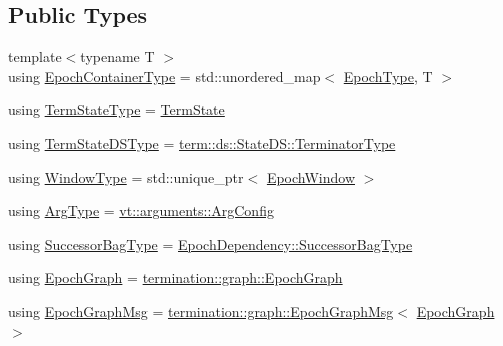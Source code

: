 \subsection*{Public Types}
\begin{DoxyCompactItemize}
\item 
{\footnotesize template$<$typename T $>$ }\\using \hyperlink{structvt_1_1term_1_1_termination_detector_a69e2615b61e072977463eea5b20b7933}{Epoch\+Container\+Type} = std\+::unordered\+\_\+map$<$ \hyperlink{namespacevt_a985a5adf291c34a3ca263b3378388236}{Epoch\+Type}, T $>$
\item 
using \hyperlink{structvt_1_1term_1_1_termination_detector_a0a47413bcb7bf5e10ecb31e7871a9268}{Term\+State\+Type} = \hyperlink{structvt_1_1term_1_1_term_state}{Term\+State}
\item 
using \hyperlink{structvt_1_1term_1_1_termination_detector_aa96c37b5c120063060c6418c48e64bd1}{Term\+State\+D\+S\+Type} = \hyperlink{structvt_1_1term_1_1ds_1_1_state_d_s_af98cfe31c25f710273ee103026d538e4}{term\+::ds\+::\+State\+D\+S\+::\+Terminator\+Type}
\item 
using \hyperlink{structvt_1_1term_1_1_termination_detector_a2c002273d9304c3cf72be85dd7d3ce52}{Window\+Type} = std\+::unique\+\_\+ptr$<$ \hyperlink{structvt_1_1term_1_1_epoch_window}{Epoch\+Window} $>$
\item 
using \hyperlink{structvt_1_1term_1_1_termination_detector_a6b172cf395acf512b3f9698651c4e10d}{Arg\+Type} = \hyperlink{structvt_1_1arguments_1_1_arg_config}{vt\+::arguments\+::\+Arg\+Config}
\item 
using \hyperlink{structvt_1_1term_1_1_termination_detector_ac8df9c8a604ee2073ce195a994aaf252}{Successor\+Bag\+Type} = \hyperlink{structvt_1_1term_1_1_epoch_dependency_a3f00b47c33158f3241ebbeb0a0cb7b1d}{Epoch\+Dependency\+::\+Successor\+Bag\+Type}
\item 
using \hyperlink{structvt_1_1term_1_1_termination_detector_af67f0ab522e54eb06d8ac541526155e3}{Epoch\+Graph} = \hyperlink{structvt_1_1termination_1_1graph_1_1_epoch_graph}{termination\+::graph\+::\+Epoch\+Graph}
\item 
using \hyperlink{structvt_1_1term_1_1_termination_detector_aec8abc5a3b161ac7df73ff3ba385dace}{Epoch\+Graph\+Msg} = \hyperlink{structvt_1_1termination_1_1graph_1_1_epoch_graph_msg}{termination\+::graph\+::\+Epoch\+Graph\+Msg}$<$ \hyperlink{structvt_1_1term_1_1_termination_detector_af67f0ab522e54eb06d8ac541526155e3}{Epoch\+Graph} $>$
\end{DoxyCompactItemize}
